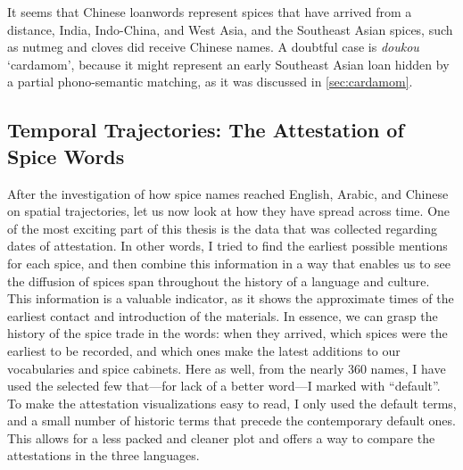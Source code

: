 It seems that Chinese loanwords represent spices that have arrived from a distance, India, Indo-China, and West Asia, and the Southeast Asian spices, such as nutmeg and cloves did receive Chinese names. A doubtful case is \textit{doukou} `cardamom', because it might represent an early Southeast Asian loan hidden by a partial phono-semantic matching, as it was discussed in \cref{sec:cardamom}.

\clearpage

\subsection{Temporal Trajectories: The Attestation of Spice Words}

After the investigation of how spice names reached English, Arabic, and Chinese on spatial trajectories, let us now look at how they have spread across time. One of the most exciting part of this thesis is the data that was collected regarding dates of attestation. In other words, I tried to find the earliest possible mentions for each spice, and then combine this information in a way that enables us to see the diffusion of spices span throughout the history of a language and culture. This information is a valuable indicator, as it shows the approximate times of the earliest contact and introduction of the materials. In essence, we can grasp the history of the spice trade in the words: when they arrived, which spices were the earliest to be recorded, and which ones make the latest additions to our vocabularies and spice cabinets. Here as well, from the nearly 360 names, I have used the selected few that---for lack of a better word---I marked with ``default''. To make the attestation visualizations easy to read, I only used the default terms, and a small number of historic terms that precede the contemporary default ones. This allows for a less packed and cleaner plot and offers a way to compare the attestations in the three languages. 

